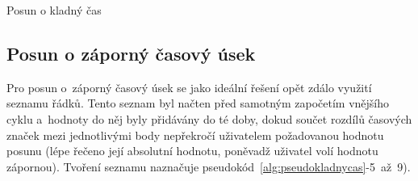 \begin{algorithm}
    \caption{Posun o kladný čas}
    \label{alg:pseudokladnycas}
    \begin{algorithmic}[1]
\end{algorithmic}
\end{algorithm}

\begin{algorithm}                     
\begin{algorithmic} [1]
    \ENDWHILE
    \ENDWHILE
    \end{algorithmic}
\end{algorithm}

\subsection{Posun o záporný časový úsek}
\label{zapornycas}

Pro posun o~záporný časový úsek se jako ideální řešení opět zdálo využití seznamu řádků.
Tento seznam byl načten před samotným započetím vnějšího cyklu a~hodnoty do něj byly
přidávány do té doby, dokud součet rozdílů časových značek mezi jednotlivými body
nepřekročí uživatelem požadovanou hodnotu posunu (lépe řečeno její absolutní hodnotu,
poněvadž uživatel volí hodnotu zápornou). Tvoření seznamu naznačuje
pseudokód~\ref{alg:pseudokladnycas}-5~až~9). 

